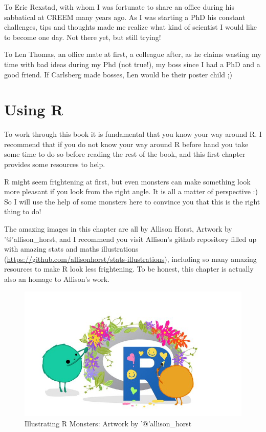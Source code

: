 \documentclass[
]{book}
\begin{document}
To Eric Rexstad, with whom I was fortunate to share an office during his sabbatical at CREEM many years ago. As I was starting a PhD his constant challenges, tips and thoughts made me realize what kind of scientist I would like to become one day. Not there yet, but still trying!

To Len Thomas, an office mate at first, a colleague after, as he claims wasting my time with bad ideas during my Phd (not true!), my boss since I had a PhD and a good friend. If Carlsberg made bosses, Len would be their poster child ;)

\hypertarget{usingRintro}{%
\chapter{Using R}\label{usingRintro}}

To work through this book it is fundamental that you know your way around R. I recommend that if you do not know your way around R before hand you take some time to do so before reading the rest of the book, and this first chapter provides some resources to help.

R might seem frightening at first, but even monsters can make something look more pleasant if you look from the right angle. It is all a matter of perspective :) So I will use the help of some monsters here to convince you that this is the right thing to do!

The amazing images in this chapter are all by Allison Horst, Artwork by '@'allison\_horst, and I recommend you visit Allison's github repository filled up with amazing stats and maths illustrations (\url{https://github.com/allisonhorst/stats-illustrations}), including so many amazing resources to make R look less frightening. To be honest, this chapter is actually also an homage to Allison's work.

\begin{figure}
\centering
\includegraphics{extfiles/monsteRs.jpg}
\caption{Illustrating R Monsters: Artwork by '@'allison\_horst}
\end{figure}
\end{document}
